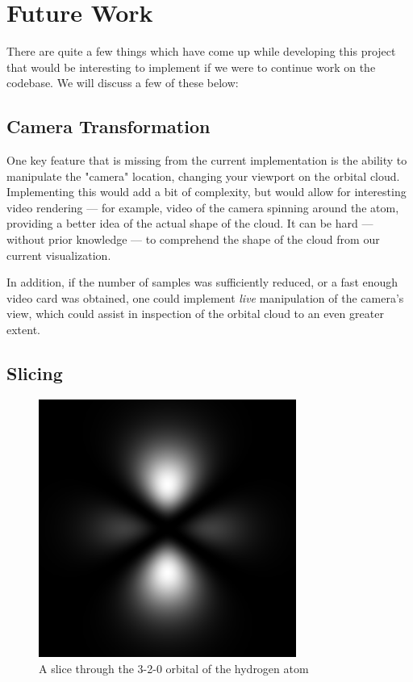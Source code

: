 \documentclass{acmsiggraph}
\begin{document}
\section{Future Work}

There are quite a few things which have come up while developing this project that would be interesting to implement if we were to continue work on the codebase. We will discuss a few of these below:

\subsection{Camera Transformation}

\label{cameraTransformation}

One key feature that is missing from the current implementation is the ability to manipulate the "camera" location, changing your viewport on the orbital cloud. Implementing this would add a bit of complexity, but would allow for interesting video rendering --- for example, video of the camera spinning around the atom, providing a better idea of the actual shape of the cloud. It can be hard --- without prior knowledge --- to comprehend the shape of the cloud from our current visualization.

In addition, if the number of samples was sufficiently reduced, or a fast enough video card was obtained, one could implement {\it live} manipulation of the camera's view, which could assist in inspection of the orbital cloud to an even greater extent.

\subsection{Slicing}

\begin{figure}
    \includegraphics[width=84.5mm]{320-slice.png}
    \caption{A slice through the 3-2-0 orbital of the hydrogen atom}
    \label{fig:slice}
\end{figure}
\end{document}
